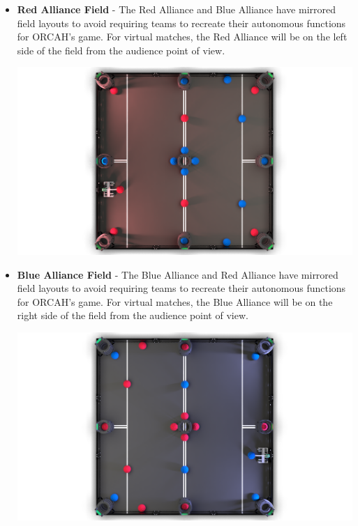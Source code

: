 \documentclass[letterpaper, 12pt]{article}
\begin{document}
\begin{itemize}[label={}]
\newpage

\item\textbf{Red Alliance Field} - The Red Alliance and Blue Alliance have mirrored field layouts to avoid requiring teams to recreate their autonomous functions for ORCAH’s game.  For virtual matches, the Red Alliance will be on the left side of the field from the audience point of view.

\begin{center}
\includegraphics[scale=0.25]{redfield}
\end{center}

\item\textbf{Blue Alliance Field} - The Blue Alliance and Red Alliance have mirrored field layouts to avoid requiring teams to recreate their autonomous functions for ORCAH’s game.  For virtual matches, the Blue Alliance will be on the right side of the field from the audience point of view. 

\begin{center}
\includegraphics[scale=0.25]{bluefield}
\end{center}


\end{itemize}
\end{document}
